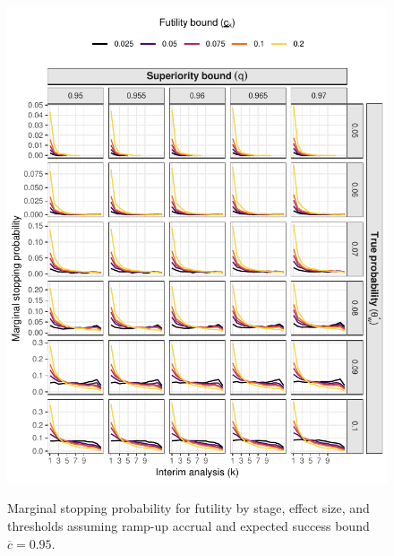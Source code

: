 \documentclass{article}
\begin{document}
\begin{figure}[!ht]
	\caption{Marginal stopping probability for futility by stage, effect size, and thresholds assuming ramp-up accrual and expected success bound $\overline{c}=0.95$.}
	\includegraphics{figures/stop_futility_5.pdf}
	\label{fig:stop_futility_rampup}
\end{figure}
\end{document}
